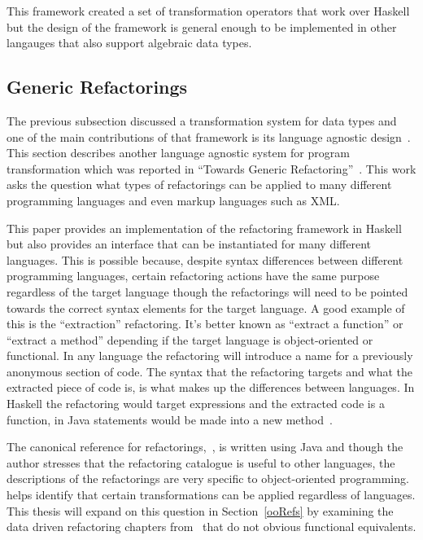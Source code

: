 This framework created a set of transformation operators that work over Haskell but the design of the framework is general enough to be implemented in other langauges that also support algebraic data types.

\subsection{Generic Refactorings}

The previous subsection discussed a transformation system for data types and one of the main contributions of that framework is its language agnostic design~\citep{dataTypeTransformation}. This section describes another language agnostic system for program transformation which was reported in ``Towards Generic Refactoring''~\citep{genericRefactoring}. This work asks the question what types of refactorings can be applied to many different programming languages and even markup languages such as XML. 

This paper provides an implementation of the refactoring framework in Haskell but also provides an interface that can be instantiated for many different languages. This is possible because, despite syntax differences between different programming languages, certain refactoring actions have the same purpose regardless of the target language though the refactorings will need to be pointed towards the correct syntax elements for the target language. A good example of this is the ``extraction'' refactoring. It's better known as ``extract a function'' or ``extract a method'' depending if the target language is object-oriented or functional. In any language the refactoring will introduce a name for a previously anonymous section of code. The syntax that the refactoring targets and what the extracted piece of code is, is what makes up the differences between languages. In Haskell the refactoring would target expressions and the extracted code is a function, in Java statements would be made into a new method~\citep{genericRefactoring}. 

The canonical reference for refactorings,~\cite{fowler}, is written using Java and though the author stresses that the refactoring catalogue is useful to other languages, the descriptions of the refactorings are very specific to object-oriented programming.~\cite{genericRefactoring} helps identify that certain transformations can be applied regardless of languages. This thesis will expand on this question in Section~\ref{ooRefs} by examining the data driven refactoring chapters from~\cite{fowler} that do not obvious functional equivalents.


